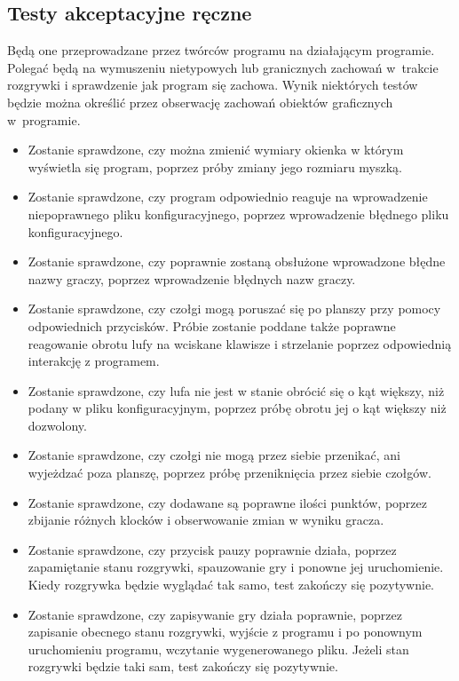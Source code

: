 \documentclass[12pt]{report}
\begin{document}
\subsection{Testy akceptacyjne ręczne}
Będą one przeprowadzane przez twórców programu na działającym programie. Polegać będą na wymuszeniu nietypowych lub granicznych zachowań w~trakcie rozgrywki i sprawdzenie jak program się zachowa. Wynik niektórych testów będzie można określić przez obserwację zachowań obiektów graficznych w~programie.
\begin{itemize}
    \item Zostanie sprawdzone, czy można zmienić wymiary okienka w którym wyświetla się program, poprzez próby zmiany jego rozmiaru myszką.
    \item Zostanie sprawdzone, czy program odpowiednio reaguje na wprowadzenie niepoprawnego pliku konfiguracyjnego, poprzez wprowadzenie błędnego pliku konfiguracyjnego.
    \item Zostanie sprawdzone, czy poprawnie zostaną obsłużone wprowadzone błędne nazwy graczy, poprzez wprowadzenie błędnych nazw graczy.
    \item Zostanie sprawdzone, czy czołgi mogą poruszać się po planszy przy pomocy odpowiednich przycisków. Próbie zostanie poddane także poprawne reagowanie obrotu lufy na wciskane klawisze i strzelanie poprzez odpowiednią interakcję z programem.
    \item Zostanie sprawdzone, czy lufa nie jest w stanie obrócić się o kąt większy, niż podany w pliku konfiguracyjnym, poprzez próbę obrotu jej o kąt większy niż dozwolony.
    \item Zostanie sprawdzone, czy czołgi nie mogą przez siebie przenikać, ani wyjeżdzać poza planszę, poprzez próbę przeniknięcia przez siebie czołgów.
    \item Zostanie sprawdzone, czy dodawane są poprawne ilości punktów, poprzez zbijanie różnych klocków i obserwowanie zmian w wyniku gracza.
    \item Zostanie sprawdzone, czy przycisk pauzy poprawnie działa, poprzez zapamiętanie stanu rozgrywki, spauzowanie gry i ponowne jej uruchomienie. Kiedy rozgrywka będzie wyglądać tak samo, test zakończy się pozytywnie.
    \item Zostanie sprawdzone, czy zapisywanie gry działa poprawnie, poprzez zapisanie obecnego stanu rozgrywki, wyjście z programu i po ponownym uruchomieniu programu, wczytanie wygenerowanego pliku. Jeżeli stan rozgrywki będzie taki sam, test zakończy się pozytywnie.
\end{itemize}
\end{document}
